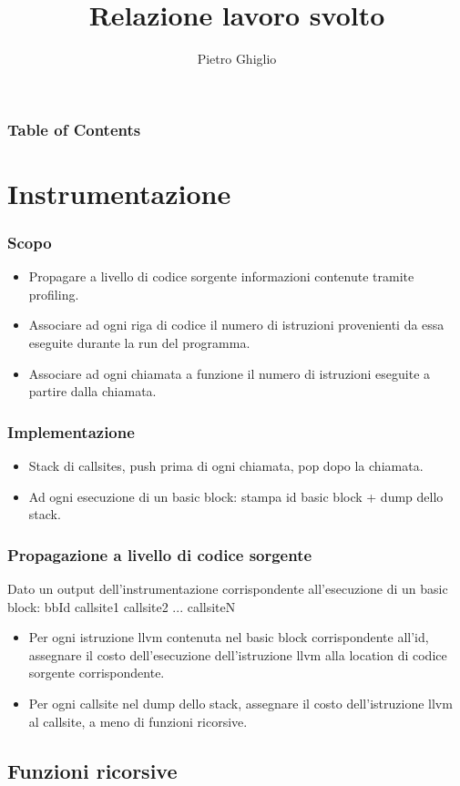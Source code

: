 \documentclass{beamer}
\title{Relazione lavoro svolto}
\author{Pietro Ghiglio}
\begin{document}
\titlepage

\begin{frame}
\frametitle{Table of Contents}
\tableofcontents
\end{frame}




\section{Instrumentazione}
\begin{frame}
\frametitle{Scopo}
\begin{itemize}
\item Propagare a livello di codice sorgente informazioni contenute tramite profiling.
\item Associare ad ogni riga di codice il numero di istruzioni provenienti da essa eseguite durante la run del programma. 
\item Associare ad ogni chiamata a funzione il numero di istruzioni eseguite a partire dalla chiamata.
\end{itemize}
\end{frame}

\begin{frame}
\frametitle{Implementazione}
\begin{itemize}
\item Stack di callsites, push prima di ogni chiamata, pop dopo la chiamata.
\item Ad ogni esecuzione di un basic block: stampa id basic block + dump dello stack. 
\end{itemize}
\end{frame}

\begin{frame}
\frametitle{Propagazione a livello di codice sorgente}
Dato un output dell'instrumentazione corrispondente all'esecuzione di un basic block: bbId callsite1 callsite2 ... callsiteN
\begin{itemize}
\item Per ogni istruzione llvm contenuta nel basic block corrispondente all'id, assegnare il costo dell'esecuzione dell'istruzione llvm alla location di codice sorgente corrispondente.
\item Per ogni callsite nel dump dello stack, assegnare il costo dell'istruzione llvm al callsite, a meno di funzioni ricorsive.
\end{itemize}
\end{frame}

\subsection{Funzioni ricorsive}
\end{document}
